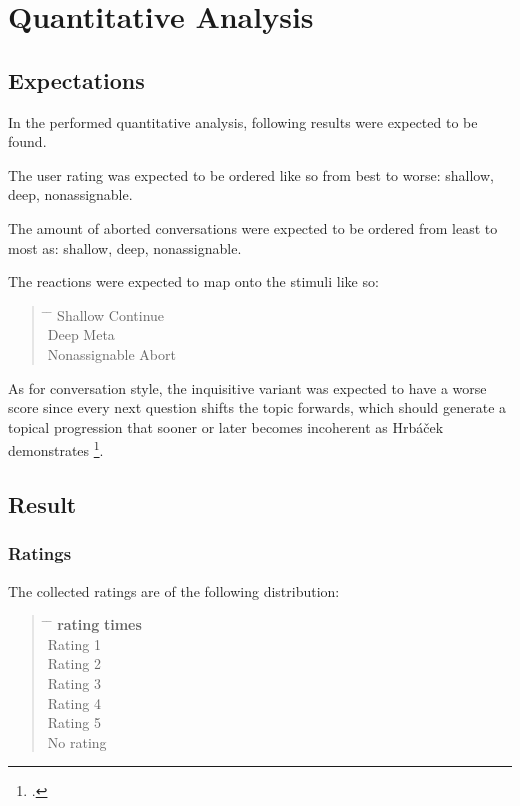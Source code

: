 


\chapter{Quantitative Analysis}

\section{Expectations}

In the performed quantitative analysis,
following results were expected to be found.

The user rating was expected to be ordered like so from best to worse:
shallow, deep, nonassignable.

The amount of aborted conversations were expected to be ordered
from least to most as:
shallow, deep, nonassignable.

The reactions were expected to map onto the stimuli like so:

\begin{quote}
\begin{tabbing}
\hspace{4cm} \= \hspace{4cm} \= \kill %
Shallow \> Continue \\
Deep \> Meta \\
Nonassignable \> Abort \\
\end{tabbing}
\end{quote}

As for conversation style, the inquisitive variant was expected to have a worse score
since every next question shifts the topic forwards, which should generate a topical progression
that sooner or later becomes incoherent as Hrbáček demonstrates \footcite[p.~30]{hrbacek1994}.

\section{Result}

\subsection{Ratings}

The collected ratings are of the following distribution:

\begin{quote}
\begin{tabbing}
\hspace{4cm} \= \hspace{4cm} \= \kill %
\textbf{rating} \> \textbf{times} \\
Rating 1  \\
Rating 2  \\
Rating 3  \\
Rating 4  \\
Rating 5  \\
No rating  \\
\end{tabbing}
\end{quote}

